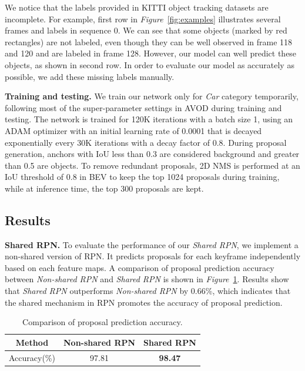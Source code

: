 \documentclass[letterpaper, 10pt, conference]{ieeeconf}  %
\def\figurename{\emph{Figure}}
\begin{document}
We notice that the labels provided in KITTI object tracking datasets are incomplete. For example, first row in \figurename \, \ref{fig:examples} illustrates several frames and labels in sequence 0. We can see that some objects (marked by red rectangles) are not labeled, even though they can be well observed in frame 118 and 120 and are labeled in frame 128. However, our model can well predict these objects, as shown in second row. In order to evaluate our model as accurately as possible, we add these missing labels manually.

\textbf{Training and testing.} We train our network only for \textit{Car} category temporarily, following most of the super-parameter settings in AVOD \cite{ku2018joint} during training and testing. The network is trained for 120K iterations with a batch size 1, using an ADAM \cite{kingma2014adam} optimizer with an initial learning rate of 0.0001 that is decayed exponentially every 30K iterations with a decay factor of 0.8. During proposal generation, anchors with IoU less than 0.3 are considered background and greater than 0.5 are objects. To remove redundant proposals, 2D NMS is performed at an IoU threshold of 0.8 in BEV to keep the top 1024 proposals during training, while at inference time, the top 300 proposals are kept. 

\subsection{Results}
\textbf{Shared RPN.} To evaluate the performance of our \textit{Shared RPN}, we implement a non-shared version of RPN. It predicts proposals for each keyframe independently based on each feature maps. A comparison of proposal prediction accuracy between \textit{Non-shared RPN} and \textit{Shared RPN} is shown in \figurename \, \ref{table:rpn_result}. Results show that \textit{Shared RPN} outperforms \textit{Non-shared RPN} by 0.66\%, which indicates that the shared mechanism in RPN promotes the accuracy of proposal prediction. 
\begin{table}[h]\centering
	\vspace{-0.4cm}
		\begin{tabular}{ccc}
			\toprule[1pt]
			Method        & Non-shared RPN & Shared RPN  \\ \midrule
			Accuracy(\%)  & 97.81      & \textbf{98.47}       \\
			\bottomrule[1pt]
	\end{tabular}
	\caption{Comparison of proposal prediction accuracy.}
	\label{table:rpn_result}
	\vspace{-0.4cm}
\end{table}
\end{document}
